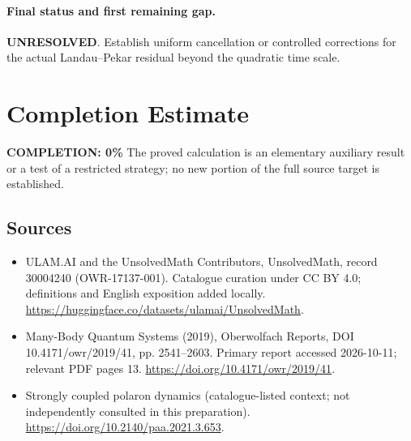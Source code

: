 \documentclass[11pt]{article}
\begin{document}
\paragraph{Final status and first remaining gap.}
\textbf{UNRESOLVED}. Establish uniform cancellation or controlled corrections for the actual Landau–Pekar residual beyond the quadratic time scale.

\section{Completion Estimate}
\noindent\textbf{COMPLETION: 0\%}
The proved calculation is an elementary auxiliary result or a test of a restricted strategy; no new portion of the full source target is established.

\subsection{Sources}
\begin{itemize}
\item[\hypertarget{source:30004240:1}{S1}] ULAM.AI and the UnsolvedMath Contributors, UnsolvedMath, record 30004240 (OWR-17137-001). Catalogue curation under CC BY 4.0; definitions and English exposition added locally.
\url{https://huggingface.co/datasets/ulamai/UnsolvedMath}.
\item[\hypertarget{source:30004240:2}{S2}] Many-Body Quantum Systems (2019), Oberwolfach Reports, DOI 10.4171/owr/2019/41, pp. 2541--2603. Primary report accessed 2026-10-11; relevant PDF pages 13.
\url{https://doi.org/10.4171/owr/2019/41}.
\item[\hypertarget{source:30004240:3}{S3}] Strongly coupled polaron dynamics (catalogue-listed context; not independently consulted in this preparation).
\url{https://doi.org/10.2140/paa.2021.3.653}.
\end{itemize}
\label{end:30004240}
\end{document}
